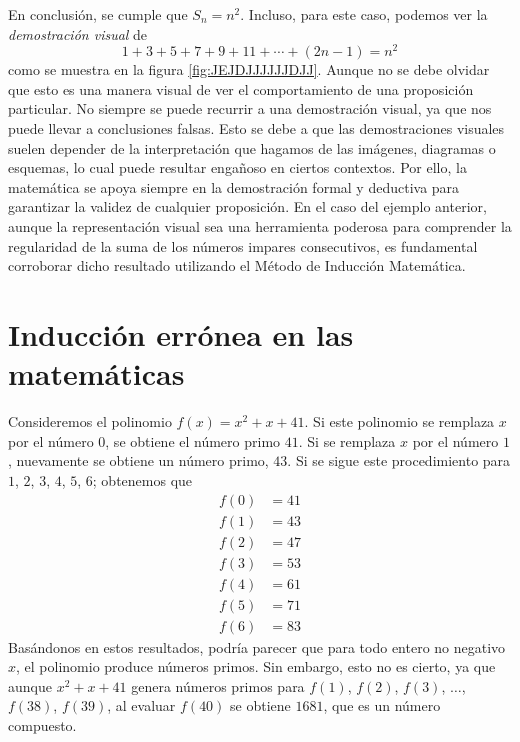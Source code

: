 En conclusión, se cumple que $S_n = n^2$. Incluso, para este caso, podemos ver la \emph{demostración visual} de
$$1 + 3 + 5 + 7 + 9 + 11 + \cdots + (2n - 1) = n^2$$
como se muestra en la figura \ref{fig:JEJDJJJJJJDJJ}. Aunque no se debe olvidar que esto es una manera visual de ver el comportamiento de una proposición particular. No siempre se puede recurrir a una demostración visual, ya que nos puede llevar a conclusiones falsas. Esto se debe a que las demostraciones visuales suelen depender de la interpretación que hagamos de las imágenes, diagramas o esquemas, lo cual puede resultar engañoso en ciertos contextos. Por ello, la matemática se apoya siempre en la demostración formal y deductiva para garantizar la validez de cualquier proposición. En el caso del ejemplo anterior, aunque la representación visual sea una herramienta poderosa para comprender la regularidad de la suma de los números impares consecutivos, es fundamental corroborar dicho resultado utilizando el Método de Inducción Matemática.

\newpage

\section{Inducción errónea en las matemáticas}

\begin{examplebox}{}{}
    Consideremos el polinomio $f(x)=x^2+x+41$. Si este polinomio se remplaza $x$ por el número $0$, se obtiene el número primo $41$. Si se remplaza $x$ por el número $1$, nuevamente se obtiene un número primo, $43$. Si se sigue este procedimiento para $1$, $2$, $3$, $4$, $5$, $6$; obtenemos que
    \begin{align*}
        f(0) &=41 \\
        f(1) &=43 \\
        f(2) &=47 \\
        f(3) &=53 \\
        f(4) &=61 \\
        f(5) &=71 \\
        f(6) &=83
    \end{align*}
    Basándonos en estos resultados, podría parecer que para todo entero no negativo $x$, el polinomio produce números primos. Sin embargo, esto no es cierto, ya que aunque $x^2 + x + 41$ genera números primos para $f(1)$, $f(2)$, $f(3)$, $\dots$, $f(38)$, $f(39)$, al evaluar $f(40)$ se obtiene $1681$, que es un número compuesto.
\end{examplebox}

